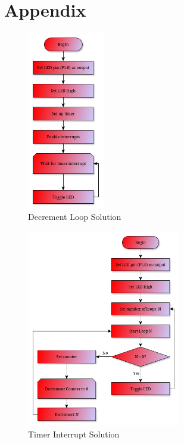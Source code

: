 \documentclass{article}
\begin{document}
\pagebreak

\section*{Appendix}

\begin{centering}
\begin{figure}[H]
\label{system}
\centering
\includegraphics[width = 0.3\textwidth]{Lab0_part1.png}
\captionsetup{format = hang, width = 0.75\textwidth}
\caption{Decrement Loop Solution}
\label{fig:DecLoop}
\end{figure}
\end{centering}

\pagebreak

\begin{centering}
\begin{figure}[H]
\label{system}
\centering
\includegraphics[width = 0.6\textwidth]{Lab0_part2.png}
\captionsetup{format = hang, width = 0.75\textwidth}
\caption{Timer Interrupt Solution}
\label{fig:Int}
\end{figure}
\end{centering}
\end{document}
